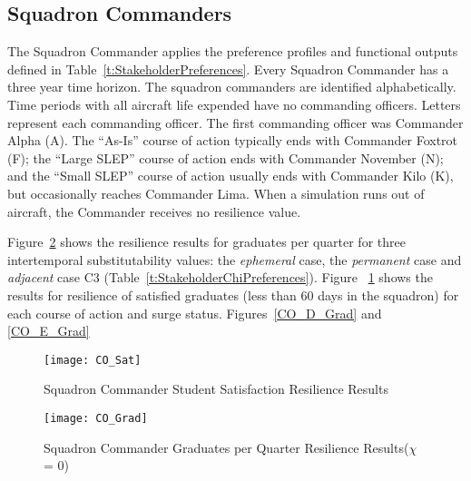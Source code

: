 \documentclass[preprint,12pt]{elsarticle}
\begin{document}
\subsection{Squadron Commanders}

The Squadron Commander applies the preference profiles and functional
outputs defined in Table~\ref{t:StakeholderPreferences}. Every
Squadron Commander has a three year time horizon. The squadron commanders are
identified alphabetically. Time periods with all aircraft life
expended have no commanding officers. Letters represent each
commanding officer. The first commanding officer was 
Commander Alpha (A). The ``As-Is'' course of action typically ends
with Commander Foxtrot (F); the ``Large SLEP'' course of action ends
with Commander November (N); and the ``Small SLEP'' course of action
usually ends with Commander Kilo (K), but occasionally reaches
Commander Lima. When a simulation runs out of aircraft, the Commander
receives no resilience value.

Figure~\ref{f:CO_Grad} shows the resilience
results for graduates per quarter for three intertemporal
substitutability values: the \emph{ephemeral} case, the
\emph{permanent} case and  \emph{adjacent} case C3
(Table~\ref{t:StakeholderChiPreferences}). Figure ~\ref{f:CO_Sat} shows the results for
resilience of satisfied graduates (less than 60 days in the squadron)
for each course of action and surge status. Figures~\ref{CO_D_Grad}
and \ref{CO_E_Grad}
\begin{figure}[h]
  \centering\texttt{[image: CO\_Sat]}
  \caption{Squadron Commander Student Satisfaction Resilience Results}
  \label{f:CO_Sat}
\end{figure}

\begin{figure}[h]
  \centering\texttt{[image: CO\_Grad]}
  \caption{Squadron Commander Graduates per Quarter Resilience
    Results($\chi$ = 0)}
  \label{f:CO_Grad}
\end{figure}
\end{document}
